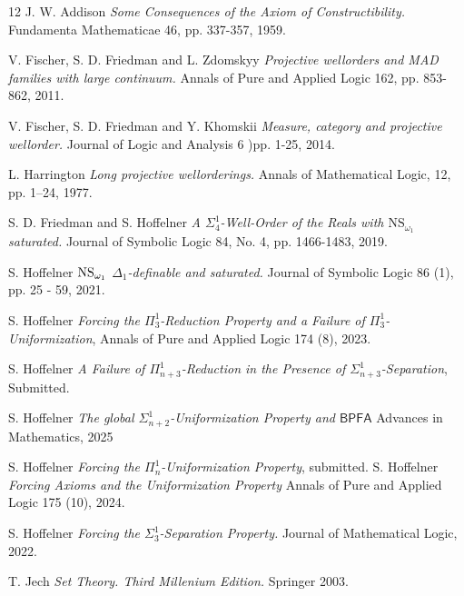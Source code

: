 \documentclass[a4paper,11pt]{article}
\newcommand{\BPFA}{\mathsf{BPFA}}
\begin{document}
\begin{thebibliography}{12}
J. W. Addison \textit{Some Consequences of the Axiom of Constructibility.} Fundamenta Mathematicae 46, pp. 337-357, 1959.

 V. Fischer, S. D. Friedman and L. Zdomskyy \textit{Projective wellorders and MAD families with large continuum.} Annals of Pure and Applied Logic 162, pp. 853-862, 2011.

 V. Fischer, S. D. Friedman and Y. Khomskii \textit{Measure, category and projective wellorder.} Journal of Logic and Analysis 6 )pp. 1-25, 2014.

 L. Harrington {\em Long projective wellorderings.} Annals of Mathematical Logic, 12, pp. 1–24, 1977. 

 S. D. Friedman and S. Hoffelner \textit{A $\Sigma^1_4$-Well-Order of the Reals with $\text{NS}_{\omega_1}$ saturated.} Journal of Symbolic Logic 84, No. 4, pp. 1466-1483, 2019.   

 S. Hoffelner \textit{$\hbox{NS}_{\omega_1}$ $\Delta_1$-definable and saturated.}  Journal of Symbolic Logic 86 (1), pp. 25 - 59, 2021.
    
  S. Hoffelner \textit{Forcing the $\Pi^1_3$-Reduction Property and a Failure of $\Pi^1_3$-Uniformization},  Annals of Pure and Applied Logic 174 (8), 2023.

 S. Hoffelner \textit{A Failure of $\Pi^1_{n+3}$-Reduction in the Presence of $\Sigma^1_{n+3}$-Separation}, Submitted.
 
 
  S. Hoffelner \textit{The global $\Sigma^1_{n+2}$-Uniformization Property and $\BPFA$} Advances in Mathematics, 2025


 S. Hoffelner \textit{Forcing the $\Pi^1_n$-Uniformization Property}, submitted. 
 S. Hoffelner \textit{Forcing Axioms and the Uniformization Property} Annals of Pure and Applied Logic 175 (10), 2024.

 S. Hoffelner \textit{Forcing the $\Sigma^1_3$-Separation Property.} Journal of Mathematical Logic,  2022.




 T. Jech \textit{Set Theory. Third Millenium Edition.} Springer 2003.
 

\end{thebibliography}
\end{document}
